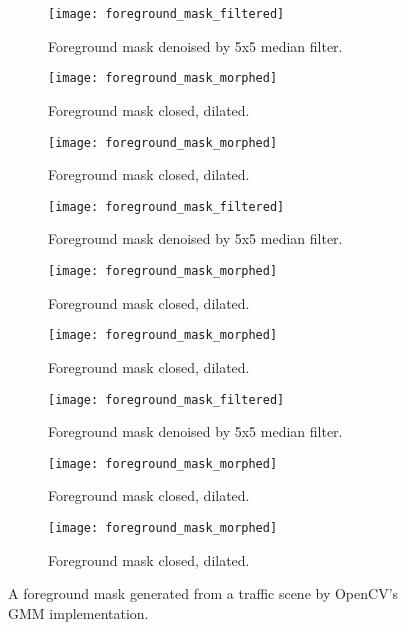 \begin{figure*}[htbp]
    \centering 
    \begin{subfigure}[b]{0.45\textwidth}
        \texttt{[image: foreground\_mask\_filtered]}
        \captionsetup{format = hang}
        \caption{Foreground mask denoised by 5x5 median filter.}
    \end{subfigure}
    \begin{subfigure}[b]{0.45\textwidth}
        \texttt{[image: foreground\_mask\_morphed]}
        \captionsetup{format = hang}
        \caption{Foreground mask closed, dilated.}
    \end{subfigure}
    \begin{subfigure}[b]{0.45\textwidth}
        \texttt{[image: foreground\_mask\_morphed]}
        \captionsetup{format = hang}
        \caption{Foreground mask closed, dilated.}
    \end{subfigure}
    \begin{subfigure}[b]{0.45\textwidth}
        \texttt{[image: foreground\_mask\_filtered]}
        \captionsetup{format = hang}
        \caption{Foreground mask denoised by 5x5 median filter.}
    \end{subfigure}
    \begin{subfigure}[b]{0.45\textwidth}
        \texttt{[image: foreground\_mask\_morphed]}
        \captionsetup{format = hang}
        \caption{Foreground mask closed, dilated.}
    \end{subfigure}
    \begin{subfigure}[b]{0.45\textwidth}
        \texttt{[image: foreground\_mask\_morphed]}
        \captionsetup{format = hang}
        \caption{Foreground mask closed, dilated.}
    \end{subfigure}
    \begin{subfigure}[b]{0.45\textwidth}
        \texttt{[image: foreground\_mask\_filtered]}
        \captionsetup{format = hang}
        \caption{Foreground mask denoised by 5x5 median filter.}
    \end{subfigure}
    \begin{subfigure}[b]{0.45\textwidth}
        \texttt{[image: foreground\_mask\_morphed]}
        \captionsetup{format = hang}
        \caption{Foreground mask closed, dilated.}
    \end{subfigure}
    \begin{subfigure}[b]{0.45\textwidth}
        \texttt{[image: foreground\_mask\_morphed]}
        \captionsetup{format = hang}
        \caption{Foreground mask closed, dilated.}
    \end{subfigure}
    \captionsetup{format=hang}
    \caption{A foreground mask generated from a traffic scene by OpenCV's GMM implementation.}
    \label{fig:foreground_mask_morphed}
\end{figure*}